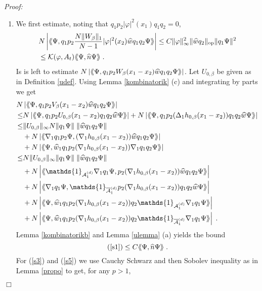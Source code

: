 \documentclass[11pt, english, american]{article}
\newcommand{\laa}{\langle\hspace{-0.08cm}\langle}
\newcommand{\raa}{\rangle\hspace{-0.08cm}\rangle}
\newenvironment{proof}{\emph{Proof:}}{\begin{flushright} $ \Box $ \end{flushright}}
\renewcommand{\phi}{\varphi}
\begin{document}
\begin{proof}
\begin{enumerate}
\item
We first estimate, noting that $q_1 p_2 |\phi|^2(x_1) q_1q_2=0$, 
\begin{align*}
&N
\left|\laa\Psi, q_1p_2 
\frac{N \|W_\beta\|_1}{N-1} |\phi|^2(x_2)
\widehat{w}q_1q_2\Psi\raa\right|
\leq
C
\|\phi\|_\infty^2
\|\widehat{w} q_2\|_{\text{op}}
\|q_1 \Psi \|^2
\\
&\leq
 \mathcal{K}(\phi, A_t)
\laa \Psi, \widehat{n} \Psi \raa
\;.
\end{align*}
Is is left to estimate $N
\left|\laa\Psi, q_1p_2W_\beta(x_1-x_2)\widehat{w}q_1q_2\Psi\raa\right|$.
Let $U_{0,\beta}$ be given as in Definition \ref{udef}. Using Lemma \ref{kombinatorik} (c) and integrating by parts we get
\begin{align}\nonumber
N&\left|\laa\Psi, q_1p_2V_\beta(x_1-x_2)\widehat{w}q_1q_2\Psi\raa\right|\\\leq&\nonumber
N\left|\laa\Psi,q_1p_2U_{0,\beta}(x_1-x_2)q_1q_2 \widehat{w}\Psi\raa\right|+
%
N\left|\laa\Psi,q_1p_2(\Delta_1
h_{0,\beta}(x_1-x_2))q_1q_2\widehat{w}\Psi\raa\right|
%
\\\leq&\nonumber
\|U_{0,\beta}\|_\infty
N\|q_1\Psi\|\;\|\widehat{w}q_1q_2\Psi\|
\\\nonumber%
&+N\left|\laa\nabla_1q_1 p_2\Psi,(\nabla_1
h_{0,\beta}(x_1-x_2))\widehat{w}q_1q_2\Psi\raa\right|
%
\\&+\nonumber
%
N\left|\laa\Psi, \widehat{w}_1q_1p_2(\nabla_1
h_{0,\beta}(x_1-x_2))\nabla_1q_1q_2\Psi\raa\right|
%
\\\leq&\label{s1}
N
 \|U_{0,\beta}\|_\infty
\|q_1\Psi\|\;\|\widehat{w}q_1q_2\Psi\|
\\\label{s2}
%
&+N\left|\laa\mathds{1}_{\mathcal{A}^{(d)}_{1}}\nabla_1q_1\Psi,p_2(\nabla_1
h_{0,\beta}(x_1-x_2))\widehat{w}q_1q_2\Psi\raa\right|
%
\\\label{s3}
&+N\left|\laa\nabla_1q_1\Psi,\mathds{1}_{\overline{\mathcal{A}}^{(d)}_{1}}p_2(\nabla_1
h_{0,\beta}(x_1-x_2))q_1q_2\widehat{w}\Psi\raa\right|
%
\\&+\label{s4}
N\left|\laa\Psi, \widehat{w}_1q_1p_2(\nabla_1
h_{0,\beta}(x_1-x_2))q_2\mathds{1}_{\mathcal{A}^{(d)}_{1}}\nabla_1q_1\Psi\raa\right|
%
\\&+\label{s5}
N\left|\laa\Psi, \widehat{w}_1q_1p_2(\nabla_1
h_{0,\beta}(x_1-x_2))q_2\mathds{1}_{\overline{\mathcal{A}}^{(d)}_{1}}\nabla_1q_1\Psi\raa\right|
\;.
\end{align}
Lemma \ref{kombinatorikb}  and Lemma \ref{ulemma} (a) yields the bound
$$(\ref{s1})\leq
%
C
\laa\Psi,\widehat{n}\Psi\raa
\;.
$$
For (\ref{s3}) and (\ref{s5}) we use Cauchy Schwarz and then Sobolev inequality as in Lemma \ref{propo} to get, for any $p > 1$,

\end{enumerate}
\end{proof}
\end{document}
